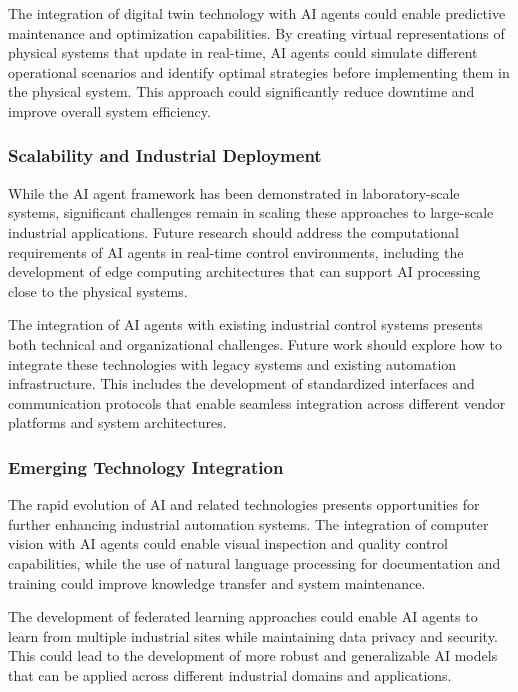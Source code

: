 The integration of digital twin technology with AI agents could enable predictive maintenance and optimization capabilities. By creating virtual representations of physical systems that update in real-time, AI agents could simulate different operational scenarios and identify optimal strategies before implementing them in the physical system. This approach could significantly reduce downtime and improve overall system efficiency.

\subsubsection{Scalability and Industrial Deployment}

While the AI agent framework has been demonstrated in laboratory-scale systems, significant challenges remain in scaling these approaches to large-scale industrial applications. Future research should address the computational requirements of AI agents in real-time control environments, including the development of edge computing architectures that can support AI processing close to the physical systems.

The integration of AI agents with existing industrial control systems presents both technical and organizational challenges. Future work should explore how to integrate these technologies with legacy systems and existing automation infrastructure. This includes the development of standardized interfaces and communication protocols that enable seamless integration across different vendor platforms and system architectures.

\subsubsection{Emerging Technology Integration}

The rapid evolution of AI and related technologies presents opportunities for further enhancing industrial automation systems. The integration of computer vision with AI agents could enable visual inspection and quality control capabilities, while the use of natural language processing for documentation and training could improve knowledge transfer and system maintenance.

The development of federated learning approaches could enable AI agents to learn from multiple industrial sites while maintaining data privacy and security. This could lead to the development of more robust and generalizable AI models that can be applied across different industrial domains and applications.

